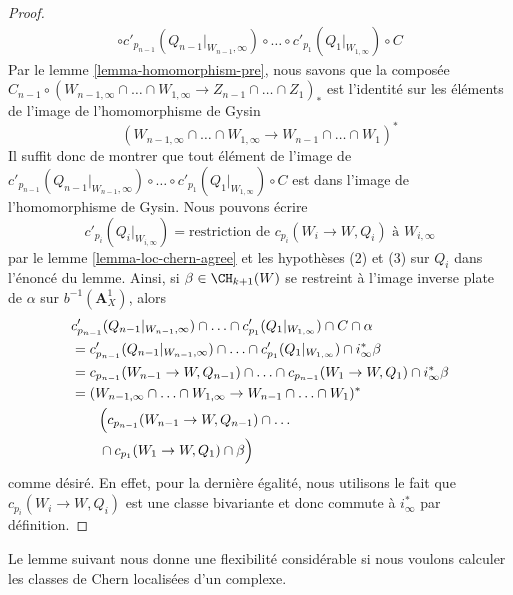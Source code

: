 \begin{proof}
\begin{align*}
\circ
c'_{p_{n - 1}}(Q_{n - 1}|_{W_{n - 1}, \infty}) \circ \ldots \circ
c'_{p_1}(Q_1|_{W_{1, \infty}})
\circ C
\end{align*}
Par le lemme \ref{lemma-homomorphism-pre},
nous savons que la composée
$C_{n - 1} \circ (W_{n - 1, \infty} \cap \ldots \cap W_{1, \infty} \to
Z_{n - 1} \cap \ldots \cap Z_1)_*$
est l'identité sur les éléments de l'image de l'homomorphisme de Gysin
$$
(W_{n - 1, \infty} \cap \ldots \cap W_{1, \infty} \to
W_{n - 1} \cap \ldots \cap W_1)^*
$$
Il suffit donc de montrer que tout élément de l'image de
$c'_{p_{n - 1}}(Q_{n - 1}|_{W_{n - 1}, \infty}) \circ \ldots \circ
c'_{p_1}(Q_1|_{W_{1, \infty}}) \circ C$
est dans l'image de l'homomorphisme de Gysin. Nous pouvons écrire
$$
c'_{p_i}(Q_i|_{W_{i, \infty}}) = \text{restriction de } c_{p_i}(W_i \to W, Q_i)
\text{ à } W_{i, \infty}
$$
par le lemme \ref{lemma-loc-chern-agree} et les hypothèses (2) et (3) sur $Q_i$
dans l'énoncé du lemme. Ainsi, si $\beta \in \CH_{k + 1}(W)$
se restreint à l'image inverse plate de $\alpha$ sur $b^{-1}(\mathbf{A}^1_X)$,
alors
\begin{align*}
& c'_{p_{n - 1}}(Q_{n - 1}|_{W_{n - 1}, \infty}) \cap \ldots \cap
c'_{p_1}(Q_1|_{W_{1, \infty}})
\cap C \cap \alpha \\
& =
c'_{p_{n - 1}}(Q_{n - 1}|_{W_{n - 1}, \infty}) \cap \ldots \cap
c'_{p_1}(Q_1|_{W_{1, \infty}})
\cap i_\infty^* \beta \\
& =
c_{p_{n - 1}}(W_{n - 1} \to W, Q_{n - 1}) \cap \ldots \cap
c_{p_{n - 1}}(W_1 \to W, Q_1) \cap i_\infty^* \beta \\
& =
(W_{n - 1, \infty} \cap \ldots \cap W_{1, \infty} \to
W_{n - 1} \cap \ldots \cap W_1)^* \\
&\qquad {}\Bigl(c_{p_{n - 1}}(W_{n - 1} \to W, Q_{n - 1}) \cap \ldots \\
&\qquad {}\cap c_{p_1}(W_1 \to W, Q_1) \cap \beta\Bigr)
\end{align*}
comme désiré. En effet, pour la dernière égalité, nous utilisons le fait que
$c_{p_i}(W_i \to W, Q_i)$ est une classe bivariante et donc
commute à $i_\infty^*$ par définition.
\end{proof}

\noindent
Le lemme suivant nous donne une flexibilité considérable
si nous voulons calculer les classes de Chern localisées d'un complexe.

